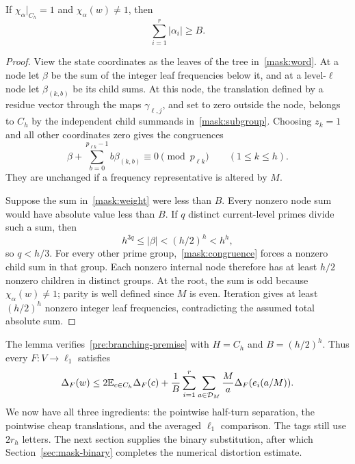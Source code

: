\begin{lemma}\label{mask:branching}
If $\chi_\alpha|_{C_h}=1$ and $\chi_\alpha(w)\ne1$, then
\begin{equation}\label{mask:weight}
 \sum_{i=1}^r|\alpha_i|\geq B.
\end{equation}
\end{lemma}
\begin{proof}
View the state coordinates as the leaves of the tree in~\eqref{mask:word}.
At a node let $\beta$ be the sum of the integer leaf frequencies below it,
and at a level-$\ell$ node let $\beta_{(k,b)}$ be its child sums.
At this node, the translation defined by a residue vector through the maps
$\gamma_{\ell,j}$, and set to zero outside the node, belongs to $C_h$ by the
independent child summands in~\eqref{mask:subgroup}. Choosing $z_k=1$ and
all other coordinates zero gives the congruences
\begin{equation}\label{mask:congruence}
 \beta+\sum_{b=0}^{p_{\ell k}-1}b\beta_{(k,b)}
       \equiv0\pmod{p_{\ell k}}\qquad(1\leq k\leq h).
\end{equation}
They are unchanged if a frequency representative is altered by $M$.

Suppose the sum in~\eqref{mask:weight} were less than $B$. Every nonzero
node sum would have absolute value less than $B$. If $q$ distinct
current-level primes divide such a sum, then
\[
 h^{3q}\leq|\beta|<(h/2)^h<h^h,
\]
so $q<h/3$. For every other prime group,~\eqref{mask:congruence} forces a
nonzero child sum in that group. Each nonzero internal node therefore has
at least $h/2$ nonzero children in distinct groups. At the root, the sum is
odd because $\chi_\alpha(w)\ne1$; parity is well defined since $M$ is even.
Iteration gives at least $(h/2)^h$ nonzero integer leaf frequencies,
contradicting the assumed total absolute sum.
\end{proof}

The lemma verifies~\eqref{pre:branching-premise} with $H=C_h$ and
$B=(h/2)^h$. Thus every $F:V\to\ell_1$ satisfies
\begin{equation}\label{mask:fourier-bound}
 \Delta_F(w)\leq2\mathbb E_{c\in C_h}\Delta_F(c)+
 \frac1B\sum_{i=1}^r\sum_{a\in\mathcal D_M}\frac Ma
       \Delta_F(e_i(a/M)).
\end{equation}
We now have all three ingredients: the pointwise half-turn separation,
the pointwise cheap translations, and the averaged $\ell_1$ comparison.
The tags still use $2r_h$ letters. The next section supplies the binary
substitution, after which Section~\ref{sec:mask-binary} completes the
numerical distortion estimate.

